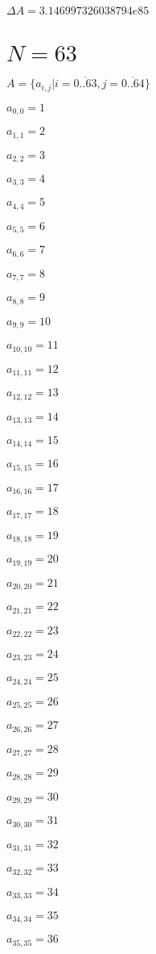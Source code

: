 \documentclass[a4paper,12pt]{article}
\begin{document}
$\Delta A = 3.146997326038794e85$



\section{ $N = 63$ }
$A = \{ a _{ i, j } | i = \overline { 0..63 }, j = \overline { 0..64 } \}$

$a _{ 0, 0 } = 1$

$a _{ 1, 1 } = 2$

$a _{ 2, 2 } = 3$

$a _{ 3, 3 } = 4$

$a _{ 4, 4 } = 5$

$a _{ 5, 5 } = 6$

$a _{ 6, 6 } = 7$

$a _{ 7, 7 } = 8$

$a _{ 8, 8 } = 9$

$a _{ 9, 9 } = 10$

$a _{ 10, 10 } = 11$

$a _{ 11, 11 } = 12$

$a _{ 12, 12 } = 13$

$a _{ 13, 13 } = 14$

$a _{ 14, 14 } = 15$

$a _{ 15, 15 } = 16$

$a _{ 16, 16 } = 17$

$a _{ 17, 17 } = 18$

$a _{ 18, 18 } = 19$

$a _{ 19, 19 } = 20$

$a _{ 20, 20 } = 21$

$a _{ 21, 21 } = 22$

$a _{ 22, 22 } = 23$

$a _{ 23, 23 } = 24$

$a _{ 24, 24 } = 25$

$a _{ 25, 25 } = 26$

$a _{ 26, 26 } = 27$

$a _{ 27, 27 } = 28$

$a _{ 28, 28 } = 29$

$a _{ 29, 29 } = 30$

$a _{ 30, 30 } = 31$

$a _{ 31, 31 } = 32$

$a _{ 32, 32 } = 33$

$a _{ 33, 33 } = 34$

$a _{ 34, 34 } = 35$

$a _{ 35, 35 } = 36$
\end{document}
